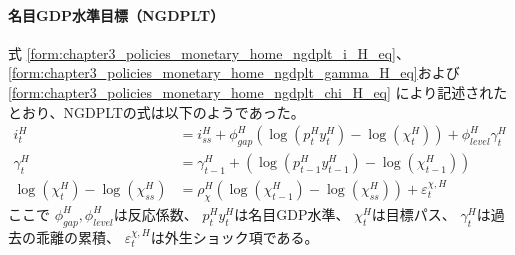 \paragraph{名目GDP水準目標（NGDPLT）}
\label{sec:chapter5_beta_shock_policies_ngdplt}
式
\eqref{form:chapter3_policies_monetary_home_ngdplt_i_H_eq}、
\eqref{form:chapter3_policies_monetary_home_ngdplt_gamma_H_eq}および
\eqref{form:chapter3_policies_monetary_home_ngdplt_chi_H_eq}
により記述されたとおり、NGDPLTの式は以下のようであった。
\begin{align}
\label{form:chapter5_beta_shock_policies_ngdplt_i_H_eq}
    i_t^H&=i_{ss}^H+\phi_{gap}^H(\log(p_t^H y_t^H)-\log(\chi_t^H))+\phi_{level}^H\gamma_t^H \\
\label{form:chapter5_beta_shock_policies_ngdplt_gamma_H_eq}
    \gamma_t^H&=\gamma_{t-1}^H+(\log(p_{t-1}^H y_{t-1}^H)-\log(\chi_{t-1}^H)) \\
\label{form:chapter5_beta_shock_policies_ngdplt_chi_H_eq}
    \log(\chi_t^H)-\log(\chi_{ss}^H)&=\rho_{\chi}^H\left(\log(\chi_{t-1}^H)-\log(\chi_{ss}^H)\right)+\varepsilon_t^{\chi,H}
\end{align}
ここで
\(\phi_{gap}^H, \phi_{level}^H\)は反応係数、
\(p_t^H y_t^H\)は名目GDP水準、
\(\chi_t^H\)は目標パス、
\(\gamma_t^H\)は過去の乖離の累積、
\(\varepsilon_t^{\chi,H}\)は外生ショック項である。
